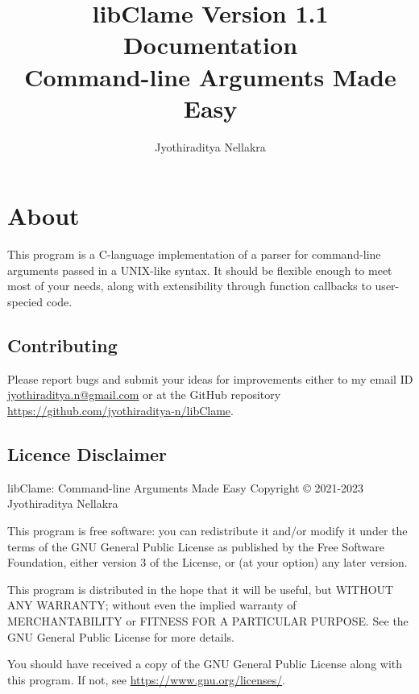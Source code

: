 \documentclass[letterpaper]{article}
\title{libClame Version 1.1 Documentation \\ Command-line Arguments Made Easy}
\author{Jyothiraditya Nellakra}
\begin{document}
\maketitle

\section*{About}

This program is a C-language implementation of a parser for command-line arguments passed in a UNIX-like syntax. It should be flexible enough to meet most of your needs, along with extensibility through function callbacks to user-specied code.

\subsection*{Contributing}

Please report bugs and submit your ideas for improvements either to my email ID \url{jyothiraditya.n@gmail.com} or at the GitHub repository \url{https://github.com/jyothiraditya-n/libClame}. 

\subsection*{Licence Disclaimer}

libClame: Command-line Arguments Made Easy Copyright {\copyright} 2021-2023 Jyothiraditya Nellakra

This program is free software: you can redistribute it and/or modify it under the terms of the GNU General Public License as published by the Free Software Foundation, either version 3 of the License, or (at your option) any later  version.

This program is distributed in the hope that it will be useful, but WITHOUT ANY WARRANTY; without even the implied warranty of MERCHANTABILITY or FITNESS FOR A PARTICULAR PURPOSE. See the GNU General Public License for more details.

You should have received a copy of the GNU General Public License along with this program. If not, see \url{https://www.gnu.org/licenses/}.

\tableofcontents










\end{document}
